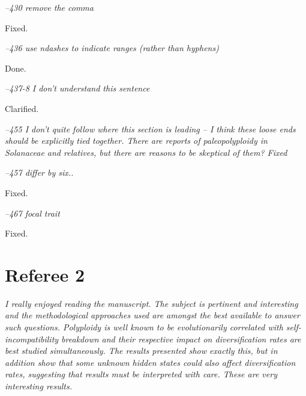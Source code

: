 \documentclass[11pt]{article}
\renewenvironment{quote}{\bigskip\noindent\itshape\ignorespaces}{\smallskip}
\begin{document}
\begin{quote}1
--430  remove the comma
\end{quote}

Fixed.

\begin{quote}
--436  use ndashes to indicate ranges (rather than hyphens)
\end{quote}

Done.


\begin{quote}
--437-8 I don't understand this sentence
\end{quote}

Clarified.

\begin{quote}
--455  I don't quite follow where this section is leading -- I think these loose ends should be explicitly tied together.
There are reports of paleopolyploidy in Solanaceae and relatives, but there are reasons to be skeptical of them?
\end{quote}
Fixed


\begin{quote}
--457  differ by six..
\end{quote}

Fixed.


\begin{quote}
--467  focal trait
\end{quote}

Fixed.


\section{Referee 2}
\vspace{-11pt}

\begin{quote}
I really enjoyed reading the manuscript.
The subject is pertinent and interesting and the methodological approaches used are amongst the best available to answer such questions.
Polyploidy is well known to be evolutionarily correlated with self-incompatibility breakdown and their respective impact on diversification rates are best studied simultaneously.
The results presented show exactly this, but in addition show that some unknown hidden states could also affect diversification rates, suggesting that results must be interpreted with care.
These are very interesting results.
\end{quote}
\end{document}
